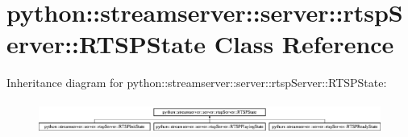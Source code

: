 \hypertarget{classpython_1_1streamserver_1_1server_1_1rtspServer_1_1RTSPState}{
\section{python::streamserver::server::rtspServer::RTSPState Class Reference}
\label{classpython_1_1streamserver_1_1server_1_1rtspServer_1_1RTSPState}
}
Inheritance diagram for python::streamserver::server::rtspServer::RTSPState:\begin{figure}[H]
\begin{center}
\leavevmode
\includegraphics[height=1.054614cm]{classpython_1_1streamserver_1_1server_1_1rtspServer_1_1RTSPState}
\end{center}
\end{figure}
